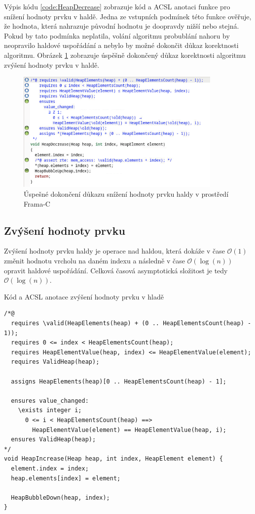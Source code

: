 Výpis kódu \ref{code:HeapDecrease} zobrazuje kód a ACSL anotaci funkce pro snížení hodnoty prvku v haldě. Jedna ze vstupních podmínek této funkce ověřuje, že hodnota, která nahrazuje původní hodnotu je doopravdy nižší nebo stejná. Pokud by tato podmínka neplatila, volání algoritmu probublání nahoru by neopravilo haldové uspořádání a nebylo by možné dokončit důkaz korektnosti algoritmu. Obrázek \ref{img:F-C-HeapDecrease} zobrazuje úspěšně dokončený důkaz korektnosti algoritmu zvýšení hodnoty prvku v haldě.

\begin{figure}[H]
	\centering
	\includegraphics[width=10cm]{images/frama-c-HeapDecrease}
	\caption{Úspešné dokončení důkazu snížení hodnoty prvku haldy v prostředí Frama-C}
	\label{img:F-C-HeapDecrease}
\end{figure}


\subsection{Zvýšení hodnoty prvku}
\label{subsec:HeapIncrease}

Zvýšení hodnoty prvku haldy je operace nad haldou, která dokáže v čase $\mathcal{O}(1)$ změnit hodnotu vrcholu na daném indexu a následně v čase $\mathcal{O}(\log(n))$ opravit haldové uspořádání. Celková časová asymptotická složitost je tedy $\mathcal{O}(\log(n))$.

\begin{listing}[H]
	\caption{Kód a ACSL anotace zvýšení hodnoty prvku v hladě}
	\label{code:HeapIncrease}
	\begin{verbatim}
/*@
  requires \valid(HeapElements(heap) + (0 .. HeapElementsCount(heap) - 1));
  requires 0 <= index < HeapElementsCount(heap);
  requires HeapElementValue(heap, index) <= HeapElementValue(element);
  requires ValidHeap(heap);

  assigns HeapElements(heap)[0 .. HeapElementsCount(heap) - 1];

  ensures value_changed:
    \exists integer i;
      0 <= i < HeapElementsCount(heap) ==>
        HeapElementValue(element) == HeapElementValue(heap, i);
  ensures ValidHeap(heap);
*/
void HeapIncrease(Heap heap, int index, HeapElement element) {
  element.index = index;
  heap.elements[index] = element;

  HeapBubbleDown(heap, index);
}
	\end{verbatim}
\end{listing}


